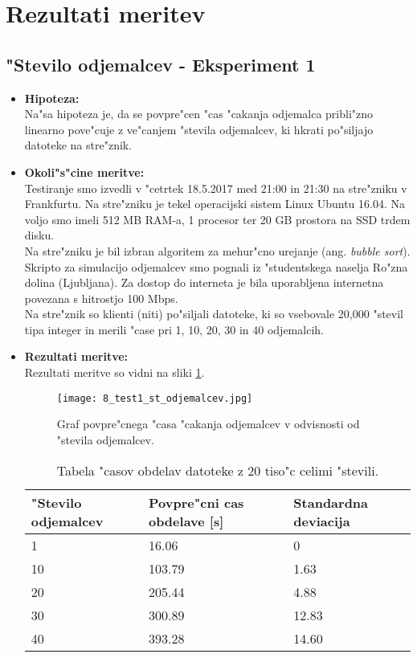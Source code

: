 \newpage
\section{Rezultati meritev}


\subsection{"Stevilo odjemalcev - Eksperiment 1}
\begin{itemize}
	\item \textbf{Hipoteza: }  \\
		Na"sa hipoteza je, da se povpre"cen "cas "cakanja odjemalca pribli"zno linearno pove"cuje z ve"canjem "stevila odjemalcev, ki hkrati po"siljajo datoteke na stre"znik.

	\item \textbf{Okoli"s"cine meritve: } \\
		Testiranje smo izvedli v "cetrtek 18.5.2017 med 21:00 in 21:30 na stre"zniku v Frankfurtu. Na stre"zniku je tekel operacijski sistem Linux Ubuntu 16.04. Na voljo smo imeli 512 MB RAM-a, 1 procesor ter 20 GB prostora na SSD trdem disku.\\Na stre"zniku je bil izbran algoritem za mehur"cno urejanje (ang. \textit{bubble sort}). Skripto za simulacijo odjemalcev smo pognali iz "studentskega naselja Ro"zna dolina (Ljubljana). Za dostop do interneta je bila uporabljena internetna povezana s hitrostjo 100 Mbps.\\ Na stre"znik so klienti (niti) po"siljali datoteke, ki so vsebovale 20,000 "stevil tipa integer in merili "case pri 1, 10, 20, 30 in 40 odjemalcih.

 	\item \textbf{Rezultati meritve: }  \\
	Rezultati meritve so vidni na sliki \ref{8_graf_1_rez}.
	\begin{figure}[!htb]
  	\centering
  	  \texttt{[image: 8\_test1\_st\_odjemalcev.jpg]}
  	\caption{Graf povpre"cnega "casa "cakanja odjemalcev v odvisnosti od "stevila odjemalcev.}
  	\label{8_graf_1_rez}
	\end{figure}

	\begin{table}[!htbp]
  	\centering
  	\begin{tabular}{ | l | l | l | }
    	\hline
    	"Stevilo odjemalcev & Povpre"cni cas obdelave [s] & Standardna deviacija\\ \hline
    	1 & 16.06     & 0 \\ \hline
    	10 & 103.79 & 1.63\\ \hline
    	20 & 205.44 & 4.88\\ \hline
    	30 & 300.89 & 12.83\\ \hline
    	40 & 393.28 & 14.60\\ \hline
  	\end{tabular}
  	\caption{Tabela "casov obdelav datoteke z 20 tiso"c celimi "stevili.}
  	\label{8_table2}
  	\centering
	\end{table}


\end{itemize}

